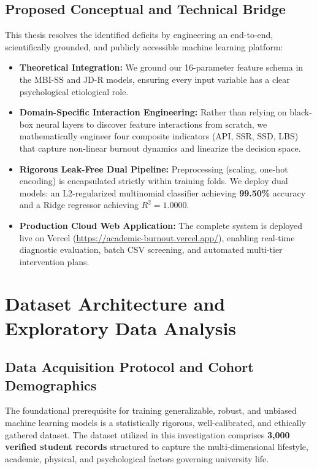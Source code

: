 \documentclass[12pt,a4paper,oneside]{report}
\begin{document}
\section{Proposed Conceptual and Technical Bridge}
\label{sec:proposed_bridge}
This thesis resolves the identified deficits by engineering an end-to-end, scientifically grounded, and publicly accessible machine learning platform:
\begin{itemize}
    \item \textbf{Theoretical Integration:} We ground our 16-parameter feature schema in the MBI-SS and JD-R models, ensuring every input variable has a clear psychological etiological role.
    \item \textbf{Domain-Specific Interaction Engineering:} Rather than relying on black-box neural layers to discover feature interactions from scratch, we mathematically engineer four composite indicators (API, SSR, SSD, LBS) that capture non-linear burnout dynamics and linearize the decision space.
    \item \textbf{Rigorous Leak-Free Dual Pipeline:} Preprocessing (scaling, one-hot encoding) is encapsulated strictly within training folds. We deploy dual models: an L2-regularized multinomial classifier achieving \textbf{99.50\%} accuracy and a Ridge regressor achieving $R^2 = 1.0000$.
    \item \textbf{Production Cloud Web Application:} The complete system is deployed live on Vercel (\url{https://academic-burnout.vercel.app/}), enabling real-time diagnostic evaluation, batch CSV screening, and automated multi-tier intervention plans.
\end{itemize}


\chapter{Dataset Architecture and Exploratory Data Analysis}
\label{ch:dataset_eda}

\section{Data Acquisition Protocol and Cohort Demographics}
\label{sec:data_acquisition}
The foundational prerequisite for training generalizable, robust, and unbiased machine learning models is a statistically rigorous, well-calibrated, and ethically gathered dataset. The dataset utilized in this investigation comprises \textbf{3,000 verified student records} structured to capture the multi-dimensional lifestyle, academic, physical, and psychological factors governing university life. 
\end{document}
